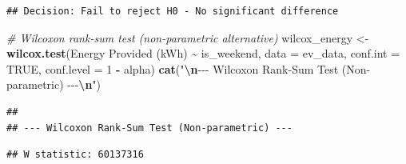 \documentclass[
  12pt,
]{article}
\newenvironment{Shaded}{\begin{snugshade}}{\end{snugshade}}
\newcommand{\AttributeTok}[1]{\textcolor[rgb]{0.13,0.29,0.53}{#1}}
\newcommand{\CommentTok}[1]{\textcolor[rgb]{0.56,0.35,0.01}{\textit{#1}}}
\newcommand{\ConstantTok}[1]{\textcolor[rgb]{0.56,0.35,0.01}{#1}}
\newcommand{\DecValTok}[1]{\textcolor[rgb]{0.00,0.00,0.81}{#1}}
\newcommand{\FunctionTok}[1]{\textcolor[rgb]{0.13,0.29,0.53}{\textbf{#1}}}
\newcommand{\NormalTok}[1]{#1}
\newcommand{\OtherTok}[1]{\textcolor[rgb]{0.56,0.35,0.01}{#1}}
\newcommand{\SpecialCharTok}[1]{\textcolor[rgb]{0.81,0.36,0.00}{\textbf{#1}}}
\newcommand{\StringTok}[1]{\textcolor[rgb]{0.31,0.60,0.02}{#1}}
\begin{document}
\begin{Shaded}
\end{Shaded}

\begin{verbatim}
## Decision: Fail to reject H0 - No significant difference
\end{verbatim}

\begin{Shaded}
\begin{Highlighting}[]
\CommentTok{\# Wilcoxon rank{-}sum test (non{-}parametric alternative)}
\NormalTok{wilcox\_energy }\OtherTok{\textless{}{-}} \FunctionTok{wilcox.test}\NormalTok{(}\StringTok{\textasciigrave{}}\AttributeTok{Energy Provided (kWh)}\StringTok{\textasciigrave{}} \SpecialCharTok{\textasciitilde{}}\NormalTok{ is\_weekend,}
    \AttributeTok{data =}\NormalTok{ ev\_data, }\AttributeTok{conf.int =} \ConstantTok{TRUE}\NormalTok{, }\AttributeTok{conf.level =} \DecValTok{1} \SpecialCharTok{{-}}\NormalTok{ alpha)}
\FunctionTok{cat}\NormalTok{(}\StringTok{"}\SpecialCharTok{\textbackslash{}n}\StringTok{{-}{-}{-} Wilcoxon Rank{-}Sum Test (Non{-}parametric) {-}{-}{-}}\SpecialCharTok{\textbackslash{}n}\StringTok{"}\NormalTok{)}
\end{Highlighting}
\end{Shaded}

\begin{verbatim}
## 
## --- Wilcoxon Rank-Sum Test (Non-parametric) ---
\end{verbatim}

\begin{Shaded}
\end{Shaded}

\begin{verbatim}
## W statistic: 60137316
\end{verbatim}
\end{document}
